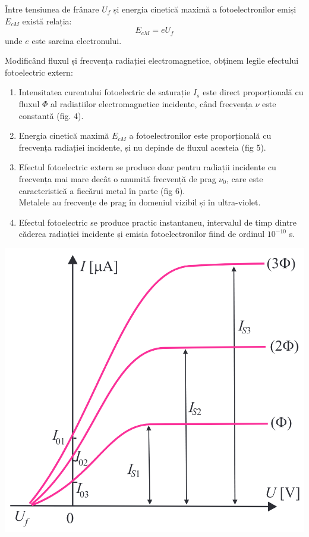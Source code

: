 \clearpage

Între tensiunea de frânare $U_f$ și energia cinetică maximă a fotoelectronilor
emiși $E_{cM}$ există relația:
\[ E_{cM} = eU_f \]
unde $e$ este sarcina electronului.

Modificând fluxul și frecvența radiației electromagnetice, obținem legile efectului
fotoelectric extern:

{%
    \begin{minipage}{0.55\textwidth}
        \renewcommand{\labelenumi}{\textbf{\Roman{enumi}.}}
        \begin{enumerate}
            \item Intensitatea curentului fotoelectric de saturație $I_s$ este
                direct proporțională cu fluxul $\Phi$ al radiațiilor
                electromagnetice incidente, când frecvența $\nu$ este constantă
                (fig. 4).
            \item Energia cinetică maximă $E_{cM}$ a fotoelectronilor este
                proporțională cu frecvența radiației incidente, și nu depinde de
                fluxul acesteia (fig 5).
            \item Efectul fotoelectric extern se produce doar pentru radiații
                incidente cu frecvența mai mare decât o anumită frecvență de prag
                $\nu_0$, care este caracteristică a fiecărui metal în parte (fig 6). \\
                Metalele au frecvențe de prag în domeniul vizibil și în ultra-violet.
            \item Efectul fotoelectric se produce practic instantaneu, intervalul
                de timp dintre căderea radiației incidente și emisia fotoelectronilor
                fiind de ordinul $10^{-10}$ s.
        \end{enumerate}
    \end{minipage}%
    \hspace{0.5cm}%
    \begin{minipage}{0.35\textwidth}
        \centering
        \captionsetup{type=figure}
        \includegraphics[width=\textwidth]{fig/graph_legea_1.png}

\end{minipage}}
